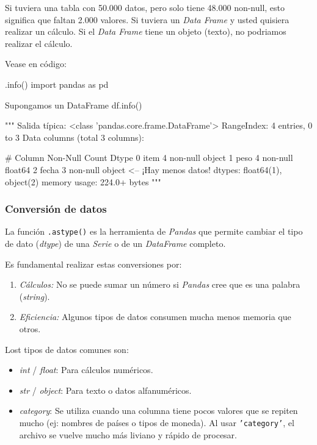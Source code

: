 \begin{ejemplo}
    Si tuviera una tabla con 50.000 datos, pero solo tiene 48.000 non-null, esto significa que faltan 2.000 valores.
    Si tuviera un \textit{Data Frame} y usted quisiera realizar un cálculo. Si el \textit{Data Frame} tiene un objeto (texto), no podriamos realizar el cálculo.
\end{ejemplo}

Vease en código:
\begin{pycode}{.info()}
import pandas as pd

Supongamos un DataFrame
df.info()

"""
Salida típica:
<class 'pandas.core.frame.DataFrame'>
RangeIndex: 4 entries, 0 to 3
Data columns (total 3 columns):

#   Column  Non-Null Count  Dtype
0   item    4 non-null      object
1   peso    4 non-null      float64
2   fecha   3 non-null      object  <-- ¡Hay menos datos!
dtypes: float64(1), object(2)
memory usage: 224.0+ bytes
"""
\end{pycode}

\subsubsection{Conversión de datos}

La función \texttt{.astype()} es la herramienta de \textit{Pandas} que permite cambiar el tipo de dato (\textit{dtype}) de una \textit{Serie} o de un \textit{DataFrame} completo.

Es fundamental realizar estas conversiones por:
\begin{enumerate}
\item \textit{Cálculos:} No se puede sumar un número si \textit{Pandas} cree que es una palabra (\textit{string}).
\item \textit{Eficiencia:} Algunos tipos de datos consumen mucha menos memoria que otros.
\end{enumerate}

Lost tipos de datos comunes son:
\begin{itemize}
\item \textit{int} / \textit{float}: Para cálculos numéricos.
\item \textit{str} / \textit{object}: Para texto o datos alfanuméricos.
\item \textit{category}: Se utiliza cuando una columna tiene pocos valores que se repiten mucho (ej: nombres de países o tipos de moneda). Al usar \texttt{'category'}, el archivo se vuelve mucho más liviano y rápido de procesar.
\end{itemize}

